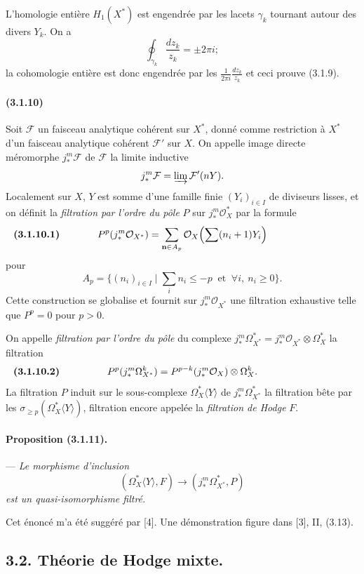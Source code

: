 \documentclass[10pt]{article}
\providecommand{\cO}{\mathcal O}
\providecommand{\cO}{\mathcal O}
\begin{document}
L'homologie entière $H_1(X^*)$ est engendrée par les lacets $\gamma_k$ tournant autour des divers $Y_k$. On a
\[
\oint_{\gamma_k}\frac{dz_k}{z_k}=\pm2\pi i;
\]
la cohomologie entière est donc engendrée par les $\frac1{2\pi i}\frac{dz_k}{z_k}$ et ceci prouve (3.1.9).

\paragraph{(3.1.10)} Soit $\mathcal F$ un faisceau analytique cohérent sur $X^*$, donné comme restriction à $X^*$ d'un faisceau analytique cohérent $\mathcal F'$ sur $X$. On appelle image directe méromorphe $j_*^m\mathcal F$ de $\mathcal F$ la limite inductive
\[
j_*^m\mathcal F=\varinjlim \mathcal F'(nY).
\]
Localement sur $X$, $Y$ est somme d'une famille finie $(Y_i)_{i\in I}$ de diviseurs lisses, et on définit la \emph{filtration par l'ordre du pôle} $P$ sur $j_*^m\cO_X^*$ par la formule
\[
\makebox[\textwidth][s]{\textbf{(3.1.10.1)}\hfill$\displaystyle P^p(j_*^m\cO_{X^*})=\sum_{\mathbf n\in A_p}\cO_X\Bigl(\sum(n_i+1)Y_i\Bigr)$\hfill\phantom{\textbf{(3.1.10.1)}}}
\]
pour
\[
A_p=\{(n_i)_{i\in I}\mid \sum_i n_i\le -p\ \text{ et }\ \forall i,\ n_i\ge0\}.
\]
Cette construction se globalise et fournit sur $j_*^m\cO_{X^*}$ une filtration exhaustive telle que $P^p=0$ pour $p>0$.

On appelle \emph{filtration par l'ordre du pôle} du complexe $j_*^m\Omega_{X^*}^*=j_*^m\cO_{X^*}\otimes\Omega_X^*$ la filtration
\[
\makebox[\textwidth][s]{\textbf{(3.1.10.2)}\hfill$\displaystyle P^p(j_*^m\Omega_{X^*}^k)=P^{p-k}(j_*^m\cO_X)\otimes\Omega_X^k.$\hfill\phantom{\textbf{(3.1.10.2)}}}
\]
La filtration $P$ induit sur le sous-complexe $\Omega_X^*\langle Y\rangle$ de $j_*^m\Omega_{X^*}^*$ la filtration bête par les $\sigma_{\ge p}(\Omega_X^*\langle Y\rangle)$, filtration encore appelée la \emph{filtration de Hodge} $F$.

\paragraph{Proposition (3.1.11).} --- {\itshape Le morphisme d'inclusion
\[
(\Omega_X^*\langle Y\rangle,F)\longrightarrow(j_*^m\Omega_{X^*}^*,P)
\]
est un quasi-isomorphisme filtré.}

Cet énoncé m'a été suggéré par [4]. Une démonstration figure dans [3], II, (3.13).

\subsection*{3.2. Théorie de Hodge mixte.}
\end{document}
